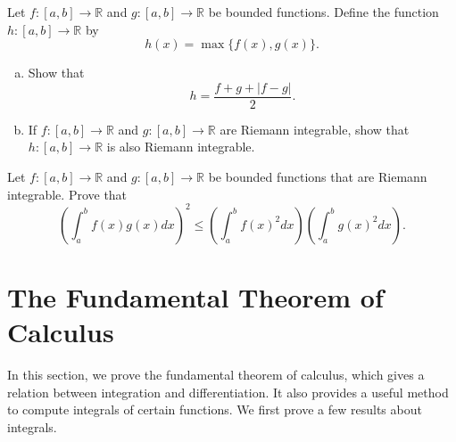 \atc

\begin{question}[label=ex230224_7]{\themyquestion}
Let $f:[a,b]\to\mathbb{R}$ and $g:[a,b]\to\mathbb{R}$ be bounded functions. Define the function
$h:[a,b]\to\mathbb{R}$ by
\[h(x)=\max\{f(x), g(x)\}.\]
\begin{enumerate}[(a)]
\item
Show that
\[h=\frac{f+g+|f-g|}{2}.\]
\item If  $f:[a,b]\to\mathbb{R}$ and $g:[a,b]\to\mathbb{R}$ are Riemann integrable, show that $h:[a,b]\to\mathbb{R}$ is also Riemann integrable.
\end{enumerate}
\end{question}
\atc
 \begin{question}{\themyquestion\;}
Let $f:[a,b]\to\mathbb{R}$ and $g:[a,b]\to\mathbb{R}$ be bounded functions that are Riemann integrable. Prove that
\[\left(\int_a^b f(x)g(x)dx\right)^2\leq \left(\int_a^bf(x)^2dx\right)\left(\int_a^bg(x)^2dx\right).\]
\end{question}
\vp
\section{The Fundamental Theorem of Calculus}\label{sec4.4}
In this section, we prove the fundamental theorem of calculus, which gives a relation between integration and differentiation. It also provides a useful method to compute integrals of certain functions. 
We first prove a few results about integrals.

